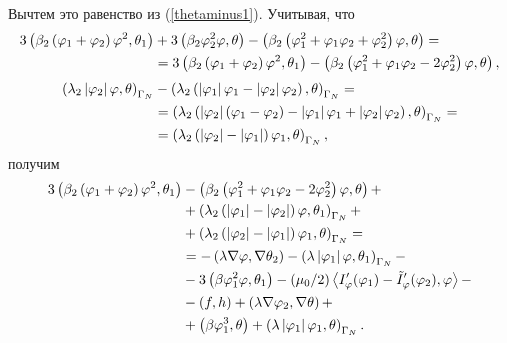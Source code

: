 Вычтем это равенство из (\ref{thetaminus1}). Учитывая, что 
\[
    \begin{split}
        3 \left( \beta_2 \left( \varphi_1 + \varphi_2 \right) \varphi^2, \theta_1 \right)
        &+ 3 \left( \beta_2 \varphi_2^2 \varphi, \theta \right) 
        - \left( \beta_2 
            \left( 
                \varphi_1^2 + \varphi_1 \varphi_2 + \varphi_2^2
             \right) \varphi, \theta
         \right) = \\
        &= 3 \left( \beta_2 \left( \varphi_1 + \varphi_2 \right) \varphi^2, \theta_1 \right) 
        - \left( \beta_2 
            \left( 
                \varphi_1^2 + \varphi_1 \varphi_2 - 2 \varphi_2^2
             \right) \varphi, \theta
         \right),
    \end{split}
\]
\[
    \begin{split}
        \left( \lambda_2 \left\vert \varphi_2 \right\vert \varphi, \theta \right)_{\Gamma_N} 
        &- \left( \lambda_2 
            \left( 
                \left\vert \varphi_1 \right\vert \varphi_1 - \left\vert \varphi_2 \right\vert \varphi_2
             \right), \theta
         \right)_{\Gamma_N} = \\
        &= \left( 
            \lambda_2 
            \left( 
                \left\vert \varphi_2 \right\vert \left( \varphi_1 -\varphi_2 \right) 
                - \left\vert \varphi_1 \right\vert \varphi_1 
                + \left\vert \varphi_2 \right\vert \varphi_2
             \right), \theta
         \right)_{\Gamma_N} = \\
        &= \left( \lambda_2 
            \left( 
                \left\vert \varphi_2 \right\vert - \left\vert \varphi_1 \right\vert
             \right) \varphi_1, \theta
         \right)_{\Gamma_N},
    \end{split}
\]
получим
\begin{equation}
    \label{33RR}
    \begin{split}
        3 \left( \beta_2 \left( \varphi_1 + \varphi_2 \right) \varphi^2, \theta_1 \right)
        &- \left( \beta_2 \left( \varphi_1^2 + \varphi_1 \varphi_2 - 2 \varphi_2^2 \right) \varphi, \theta \right) + \\
        &+ \left( \lambda_2 
            \left( 
                \left\vert \varphi_1 \right\vert - \left\vert \varphi_2 \right\vert
             \right) \varphi, \theta_1
         \right)_{\Gamma_N} + \\
        &+ \left( \lambda_2 
            \left( 
                \left\vert \varphi_2 \right\vert - \left\vert \varphi_1 \right\vert
             \right) \varphi_1, \theta
         \right)_{\Gamma_N} = \\
        &= - \left( \lambda \nabla \varphi, \nabla \theta_2 \right)
        - \left( \lambda \left\vert \varphi_1 \right\vert \varphi, \theta_1 \right)_{\Gamma_N} - \\
        &- 3 \left( \beta \varphi_1^2 \varphi, \theta_1 \right)
        - (\mu_0 / 2) \left\langle I_\varphi' (\varphi_1) - \tilde I_\varphi' (\varphi_2) , \varphi \right\rangle - \\
        &- \left( f, h \right) 
        + \left( \lambda \nabla \varphi_2, \nabla \theta \right) + \\
        &+ \left( \beta \varphi_1^3, \theta \right) 
        + \left( \lambda \left\vert \varphi_1 \right\vert \varphi_1, \theta \right)_{\Gamma_N}.
    \end{split}
\end{equation}

